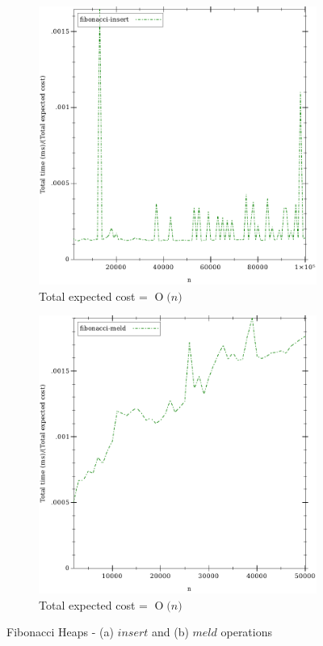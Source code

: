 \documentclass{llncs}
\newcommand{\BigO}[1]{\ensuremath{\operatorname{O}\bigl(#1\bigr)}}
\begin{document}
\begin{figure}
	\begin{subfigure}{0.5\textwidth}
		\centering
		\includegraphics[width=0.8\linewidth]{FIG/fi_insert.pdf}
		\caption{Total expected cost = \BigO{n}}
		\label{fig:fi_insert}
	\end{subfigure}%
	\begin{subfigure}{0.5\textwidth}
		\centering
		\includegraphics[width=0.8\linewidth]{FIG/fi_meld.pdf}
		\caption{Total expected cost = \BigO{n}}
		\label{fig:fi_meld}
	\end{subfigure}
	\caption{Fibonacci Heaps -  (a) $insert$ and (b) $meld$ operations}
	\label{fig:fi_insert_meld}
\end{figure}
\end{document}
